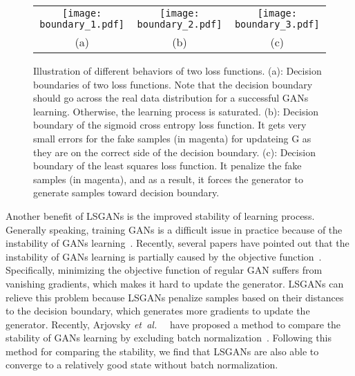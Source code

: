 \documentclass{article} %
\def\etal{{\textit{et~al.~}}}
\begin{document}
\begin{figure*}[t]
\centering
\begin{tabular}{ccc}

 \texttt{[image: boundary\_1.pdf]}
 &
 \texttt{[image: boundary\_2.pdf]}
  &
 \texttt{[image: boundary\_3.pdf]}
\\
(a)
&
(b)
&
(c)
\end{tabular}
\caption{
Illustration of different behaviors of two loss functions. (a): Decision boundaries of two loss functions. Note that the decision boundary should go across the real data distribution for a successful GANs learning. Otherwise, the learning process is saturated. (b): Decision boundary of the sigmoid cross entropy loss function. It gets very small errors for the fake samples (in magenta) for updateing G as they are on the correct side of the decision boundary. (c): Decision boundary of the least squares loss function. It penalize the fake samples (in magenta), and as a result, it forces the generator to generate samples toward decision boundary.
}
\label{fig:boundary}
\end{figure*}

Another benefit of LSGANs is the improved stability of learning process. Generally speaking, training GANs is a difficult issue in practice because of the instability of GANs learning~\cite{Radford2015}. Recently, several papers have pointed out that the instability of GANs learning is partially caused by the objective function~\cite{Arjovsky2017, Metz2016,Qi2016}. Specifically, minimizing the objective function of regular GAN suffers from vanishing gradients, which makes it hard to update the generator. LSGANs can relieve this problem because LSGANs penalize samples based on their distances to the decision boundary, which generates more gradients to update the generator. Recently, Arjovsky \etal~\cite{Arjovsky2017} have proposed a method to compare the stability of GANs learning by excluding batch normalization~\cite{Ioffe2015}. Following this method for comparing the stability, we find that LSGANs are also able to converge to a relatively good state without batch normalization.

\end{document}
